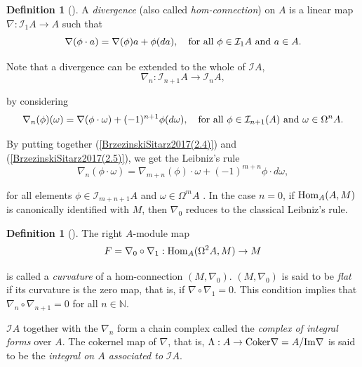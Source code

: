 \documentclass{amsart}
\theoremstyle{definition}
\newtheorem{definition}[theorem]{Definition}
\theoremstyle{remark}
\numberwithin{equation}{section}
\begin{document}
\begin{definition}[{\cite[Definition 2.1]{Brzezinski2008}}]
A {\em divergence} (also called {\em hom-connection}) on $A$ is a linear map $\nabla: \mathcal{I}_1 A \to A$ such that
\begin{equation}\label{BrzezinskiSitarz2017(2.4)}
    \nabla(\phi \cdot a) = \nabla(\phi) a + \phi(da), \quad {\rm for\ all}\ \phi \in \mathcal{I}_1 A \ {\rm and} \ a \in A.
\end{equation}  
\end{definition}

Note that a divergence can be extended to the whole of $\mathcal{I}A$, 
\[
\nabla_n: \mathcal{I}_{n+1} A \to \mathcal{I}_{n} A,
\]

by considering
\begin{equation}\label{BrzezinskiSitarz2017(2.5)}
\nabla_n(\phi)(\omega) = \nabla(\phi \cdot \omega) + (-1)^{n+1} \phi(d \omega), \quad {\rm for\ all}\ \phi \in \mathcal{I}_{n+1}(A)\ {\rm and} \ \omega \in \Omega^n A.
\end{equation}

By putting together (\ref{BrzezinskiSitarz2017(2.4)}) and (\ref{BrzezinskiSitarz2017(2.5)}), we get the Leibniz's rule 
\begin{equation}
    \nabla_n(\phi \cdot \omega) = \nabla_{m + n}(\phi) \cdot \omega + (-1)^{m + n} \phi \cdot d\omega,
\end{equation}

for all elements $\phi \in \mathcal{I}_{m + n + 1} A$ and $\omega \in \Omega^m A$ \cite[Lemma 3.2]{Brzezinski2008}. In the case $n = 0$, if ${\rm Hom}_A(A, M)$ is canonically identified with $M$, then $\nabla_0$ reduces to the classical Leibniz's rule.

\begin{definition}[{\cite[Definition 3.4]{Brzezinski2008}}]
The right $A$-module map 
\[
F = \nabla_0 \circ \nabla_1: {\rm Hom}_A(\Omega^{2} A, M) \to M
\] 

is called a {\em curvature} of a hom-connection $(M, \nabla_0)$. $(M, \nabla_0)$ is said to be {\em flat} if its curvature is the zero map, that is, if $\nabla \circ \nabla_1 = 0$. This condition implies that $\nabla_n \circ \nabla_{n+1} = 0$ for all $n\in \mathbb{N}$.
\end{definition}

$\mathcal{I} A$ together with the $\nabla_n$ form a chain complex called the {\em complex of integral forms} over $A$. The cokernel map of $\nabla$, that is, $\Lambda: A \to {\rm Coker} \nabla = A / {\rm Im} \nabla$ is said to be the {\em integral on $A$ associated to} $\mathcal{I}A$.
\end{document}
